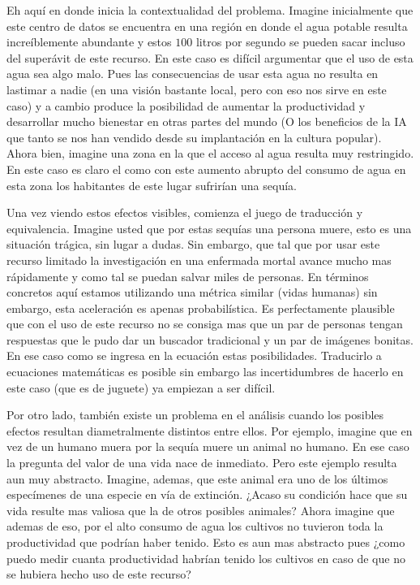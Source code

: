 \documentclass[12pt]{exam}
\begin{document}
Eh aquí en donde inicia la contextualidad del problema. Imagine inicialmente que este centro de datos se encuentra en una región en donde el agua potable resulta increíblemente abundante y estos $100$ litros por segundo se pueden sacar incluso del superávit de este recurso. En este caso es difícil argumentar que el uso de esta agua sea algo malo. Pues las consecuencias de usar esta agua no resulta en lastimar a nadie (en una visión bastante local, pero con eso nos sirve en este caso) y a cambio produce la posibilidad de aumentar la productividad y desarrollar mucho bienestar en otras partes del mundo (O los beneficios de la IA que tanto se nos han vendido desde su implantación en la cultura popular). Ahora bien, imagine una zona en la que el acceso al agua resulta muy restringido. En este caso es claro el como con este aumento abrupto del consumo de agua en esta zona los habitantes de este lugar sufrirían una sequía.

Una vez viendo estos efectos visibles, comienza el juego de traducción y equivalencia. Imagine usted que por estas sequías una persona muere, esto es una situación trágica, sin lugar a dudas. Sin embargo, que tal que por usar este recurso limitado la investigación en una enfermada mortal avance mucho mas rápidamente y como tal se puedan salvar miles de personas. En términos concretos aquí estamos utilizando una métrica similar (vidas humanas) sin embargo, esta aceleración es apenas probabilística. Es perfectamente plausible que con el uso de este recurso no se consiga mas que un par de personas tengan respuestas que le pudo dar un buscador tradicional y un par de imágenes bonitas. En ese caso como se ingresa en la ecuación estas posibilidades. Traducirlo a ecuaciones matemáticas es posible sin embargo las incertidumbres de hacerlo en este caso (que es de juguete) ya empiezan a ser difícil.

Por otro lado, también existe un problema en el análisis cuando los posibles efectos resultan diametralmente distintos entre ellos. Por ejemplo, imagine que en vez de un humano muera por la sequía muere un animal no humano. En ese caso la pregunta del valor de una vida nace de inmediato. Pero este ejemplo resulta aun muy abstracto. Imagine, ademas, que este animal era uno de los últimos especímenes de una especie en vía de extinción. ¿Acaso su condición hace que su vida resulte mas valiosa que la de otros posibles animales? Ahora imagine que ademas de eso, por el alto consumo de agua los cultivos no tuvieron toda la productividad que podrían haber tenido. Esto es aun mas abstracto pues ¿como puedo medir cuanta productividad habrían tenido los cultivos en caso de que no se hubiera hecho uso de este recurso?
\end{document}
